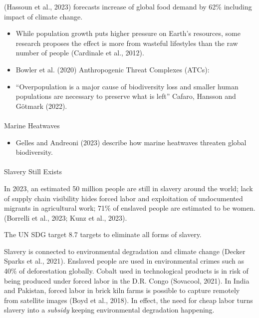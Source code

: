 \documentclass[
  letterpaper,
  DIV=11,
  numbers=noendperiod]{scrartcl}
\makeatletter
\let\oldparagraph\paragraph
\renewcommand{\paragraph}{
    \@ifstar
      \xxxParagraphStar
      \xxxParagraphNoStar
  }
\newcommand{\xxxParagraphStar}[1]{\oldparagraph*{#1}\mbox{}}
\newcommand{\xxxParagraphNoStar}[1]{\oldparagraph{#1}\mbox{}}
\providecommand{\tightlist}{%
  \setlength{\itemsep}{0pt}\setlength{\parskip}{0pt}}\usepackage{longtable,booktabs,array}
\makeatother
\begin{document}
(Hassoun et al., 2023) forecasts increase of global food demand by 62\%
including impact of climate change.

\begin{itemize}
\item
  While population growth puts higher pressure on Earth's resources,
  some research proposes the effect is more from wasteful lifestyles
  than the raw number of people (Cardinale et al., 2012).
\item
  Bowler et al. (2020) Anthropogenic Threat Complexes (ATCs):
\item
  ``Overpopulation is a major cause of biodiversity loss and smaller
  human populations are necessary to preserve what is left'' Cafaro,
  Hansson and Götmark (2022).
\end{itemize}

\paragraph{Marine Heatwaves}\label{marine-heatwaves}

\begin{itemize}
\tightlist
\item
  Gelles and Andreoni (2023) describe how marine heatwaves threaten
  global biodiversity.
\end{itemize}

\paragraph{Slavery Still Exists}\label{slavery-still-exists}

In 2023, an estimated 50 million people are still in slavery around the
world; lack of supply chain visibility hides forced labor and
exploitation of undocumented migrants in agricultural work; 71\% of
enslaved people are estimated to be women. (Borrelli et al., 2023; Kunz
et al., 2023).

The UN SDG target 8.7 targets to eliminate all forms of slavery.

Slavery is connected to environmental degradation and climate change
(Decker Sparks et al., 2021). Enslaved people are used in environmental
crimes such as 40\% of deforestation globally. Cobalt used in
technological products is in risk of being produced under forced labor
in the D.R. Congo (Sovacool, 2021). In India and Pakistan, forced labor
in brick kiln farms is possible to capture remotely from satellite
images (Boyd et al., 2018). In effect, the need for cheap labor turns
slavery into a \emph{subsidy} keeping environmental degradation
happening.
\end{document}
